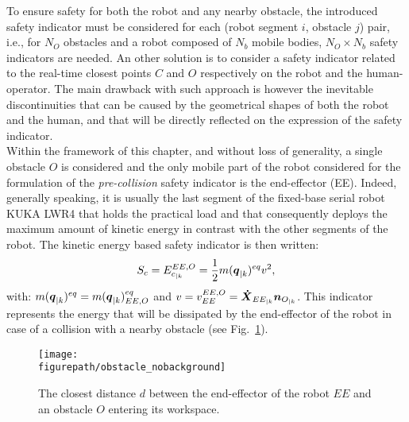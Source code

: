 To ensure safety for both the robot and any nearby obstacle, the introduced safety indicator must be considered for each (robot segment $i$, obstacle $j$) pair, i.e., for $N_O$ obstacles and a robot composed of $N_b$ mobile bodies, $N_O \times N_b$ safety indicators are needed. An other solution is to consider a safety indicator related to the real-time closest points $C$ and $O$ respectively on the robot and the human-operator. The main drawback with such approach is however the inevitable discontinuities that can be caused by the geometrical shapes of both the robot and the human, and that will be directly reflected on the expression of the safety indicator. \\
Within the framework of this chapter, and without loss of generality, a single obstacle $O$ is considered and the only mobile part of the robot considered for the formulation of the \textit{pre-collision} safety indicator is the end-effector (EE). Indeed, generally speaking, it is usually  the last segment of the fixed-base serial robot KUKA LWR4 that holds the practical load and that consequently deploys the maximum amount of kinetic energy in contrast with the other segments of the robot. The kinetic energy based safety indicator is then written: 
\begin{equation}
S_c = E_{c_{|k}}^{EE,O} = \frac{1}{2} m(\mbox{\boldmath${q}$}_{|k})^{eq} v^2,
\label{eq:Ec_constr_first}
\end{equation}
with: $m(\mbox{\boldmath${q}$}_{|k})^{eq} = m(\mbox{\boldmath${q}$}_{|k})_{EE,O}^{eq}$ and $v = v_{EE}^{EE,O} = \mbox{\boldmath${\dot{X}}$}_{EE_{|k}} \mbox{\boldmath${n}$}_{O_{|k}}$. This indicator represents the energy that will be dissipated by the end-effector of the robot  in case of a collision with a nearby obstacle (see Fig.~\ref{fig:small_dist_rob_obst}).
\begin{figure}[H]
\captionsetup{width=1\linewidth}
\centering
\texttt{[image: \\figurepath/obstacle\_nobackground]}
\caption{The closest distance $d$ between the end-effector of the robot $EE$ and an obstacle $O$ entering its workspace.}
\label{fig:small_dist_rob_obst}
\end{figure}
